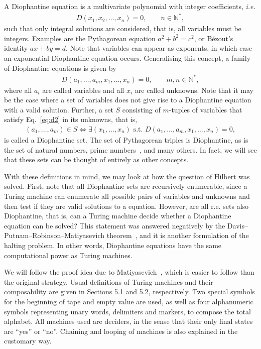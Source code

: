 \documentclass[12pt]{article}
\begin{document}
A Diophantine equation is a multivariate polynomial with integer coefficients, \emph{i.e.}
\begin{align}
    D(x_{1}, x_{2}, \dots, x_{n}) = 0, \qquad n \in \mathbb{N}^{*}, \label{eq:d1}
\end{align}
such that only integral solutions are considered, that is, all variables must be integers. Examples are the Pythagorean equation $a^{2} + b^{2} = c^{2}$, or Bézout's identity $ax + by = d$. Note that variables can appear as exponents, in which case an exponential Diophantine equation occurs. Generalising this concept, a family of Diophantine equations is given by
\begin{align}
    D(a_{1}, \dots, a_{m}, x_{1}, \dots, x_{n}) = 0, \qquad m, n \in \mathbb{N}^{*}, \label{eq:d2}
\end{align}
where all $a_{i}$ are called variables and all $x_{i}$ are called unknowns. Note that it may be the case where a set of variables does not give rise to a Diophantine equation with a valid solution. Further, a set $S$ consisting of $m$-tuples of variables that satisfy Eq.~\ref{eq:d2} in its unknowns, that is,
\begin{align}
    (a_{1}, \dots, a_{m}) \in S \Leftrightarrow \exists (x_{1}, \dots, x_{n}) \text{ s.t. } D(a_{1}, \dots, a_{m}, x_{1}, \dots, x_{n}) = 0,
\end{align}
is called a Diophantine set. The set of Pythagorean triples is Diophantine, as is the set of natural numbers, prime numbers~\cite{Jones:article:1976:jun}, and many others. In fact, we will see that these sets can be thought of entirely as other concepts.

With these definitions in mind, we may look at how the question of Hilbert was solved. First, note that all Diophantine sets are recursively enumerable, since a Turing machine can enumerate all possible pairs of variables and unknowns and then test if they are valid solutions to a equation. However, are all r.e. sets also Diophantine, that is, can a Turing machine decide whether a Diophantine equation can be solved? This statement was answered negatively by the Davis--Putnam--Robinson--Matiyasevich theorem~\cite{Matiyasevich:article:1970:jun}, and it is another formulation of the halting problem. In other words, Diophantine equations have the same computational power as Turing machines.

We will follow the proof idea due to Matiyasevich~\cite[Chap. 5]{Matiyasevich:book:1993}, which is easier to follow than the original strategy. Usual definitions of Turing machines and their composability are given in Sections 5.1 and 5.2, respectively. Two special symbols for the beginning of tape and empty value are used, as well as four alphanumeric symbols representing unary words, delimiters and markers, to compose the total alphabet. All machines used are deciders, in the sense that their only final states are ``yes'' or ``no''. Chaining and looping of machines is also explained in the customary way.
\end{document}
